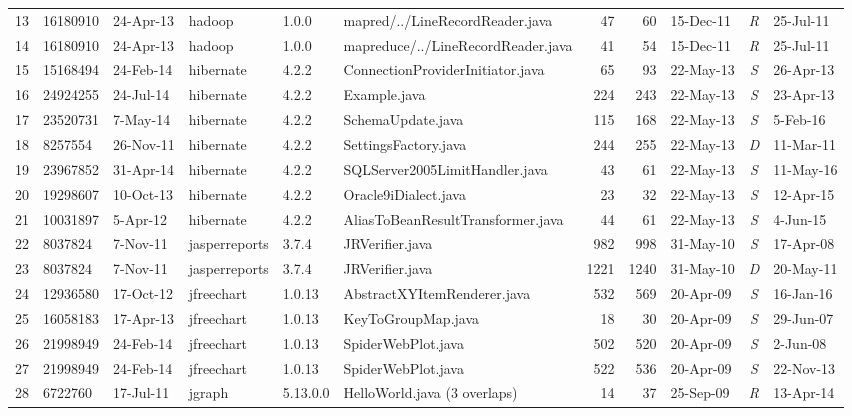 \documentclass[sigconf,review, anonymous]{acmart}
\begin{document}
\begin{table}
{\begin{tabular}{r|l|l|l|l|p{5.2cm}|r|r|l|c|l}
			13 & 16180910 & 24-Apr-13 & hadoop & 1.0.0 & mapred/../LineRecordReader.java & 47 & 60 & 15-Dec-11 & \textit{R} & 25-Jul-11 \\
			14 & 16180910 & 24-Apr-13 & hadoop & 1.0.0 & mapreduce/../LineRecordReader.java & 41 & 54 & 15-Dec-11 & \textit{R} & 25-Jul-11 \\
			15 & 15168494 & 24-Feb-14 & hibernate & 4.2.2 & ConnectionProviderInitiator.java & 65 & 93 & 22-May-13 & \textit{S} & 26-Apr-13 \\
			16 & 24924255 & 24-Jul-14 & hibernate & 4.2.2 & Example.java & 224 & 243 & 22-May-13 & \textit{S} & 23-Apr-13 \\
			17 & 23520731 & 7-May-14 & hibernate & 4.2.2 & SchemaUpdate.java & 115 & 168 & 22-May-13 & \textit{S} & 5-Feb-16 \\
			18 & 8257554 & 26-Nov-11 & hibernate & 4.2.2 & SettingsFactory.java & 244 & 255 & 22-May-13 & \textit{D} & 11-Mar-11 \\
			19 & 23967852 & 31-Apr-14 & hibernate & 4.2.2 & SQLServer2005LimitHandler.java & 43 & 61 & 22-May-13 & \textit{S} & 11-May-16 \\
			20 & 19298607 & 10-Oct-13 & hibernate & 4.2.2 & Oracle9iDialect.java & 23 & 32 & 22-May-13 & \textit{S} & 12-Apr-15 \\
			21 & 10031897 & 5-Apr-12 & hibernate & 4.2.2 & AliasToBeanResultTransformer.java & 44 & 61 & 22-May-13 & \textit{S} & 4-Jun-15 \\ 
			22 & 8037824 & 7-Nov-11 & jasperreports & 3.7.4 & JRVerifier.java & 982 & 998 & 31-May-10 & \textit{S} & 17-Apr-08 \\
			23 & 8037824 & 7-Nov-11 & jasperreports & 3.7.4 & JRVerifier.java & 1221 & 1240 & 31-May-10 & \textit{D} & 20-May-11 \\
			24 & 12936580 & 17-Oct-12 & jfreechart & 1.0.13 & AbstractXYItemRenderer.java & 532 & 569 & 20-Apr-09 & \textit{S} & 16-Jan-16 \\
			25 & 16058183 & 17-Apr-13 & jfreechart & 1.0.13 & KeyToGroupMap.java & 18 & 30 & 20-Apr-09 & \textit{S} & 29-Jun-07 \\
			26 & 21998949 & 24-Feb-14 & jfreechart & 1.0.13 & SpiderWebPlot.java & 502 & 520 & 20-Apr-09 & \textit{S} & 2-Jun-08 \\
			27 & 21998949 & 24-Feb-14 & jfreechart & 1.0.13 & SpiderWebPlot.java & 522 & 536 & 20-Apr-09 & \textit{S} & 22-Nov-13 \\
			28 & 6722760 & 17-Jul-11 & jgraph & 5.13.0.0 & HelloWorld.java (3 overlaps)  & 14 & 37 & 25-Sep-09 & \textit{R} & 13-Apr-14 \\

\end{tabular}}
\end{table}
\end{document}
